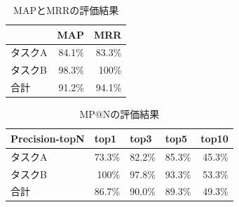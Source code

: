 \documentclass[12pt]{jarticle} %
\begin{document}
\begin{table}[h]
\caption{MAPとMRRの評価結果}
\label{map}
\begin{center}
\begin{tabular}{|p{3cm}|p{3cm}|p{3cm}|}
\hline \hline
\multicolumn{1}{|r|}{} & \multicolumn{1}{p{3cm}|}{MAP} & \multicolumn{1}{p{3cm}|}{MRR} \\ \hline
タスクA & \multicolumn{1}{r|}{84.1\%} & \multicolumn{1}{r|}{83.3\%} \\ \hline
タスクB & \multicolumn{1}{r|}{98.3\%} & \multicolumn{1}{r|}{100\%} \\ \hline
合計 & \multicolumn{1}{r|}{91.2\%} & \multicolumn{1}{r|}{94.1\%} \\ \hline
\end{tabular}
\end{center}
\end{table}

\begin{table}[h]
\caption{MP@Nの評価結果}
\label{pre}
\begin{center}
\begin{tabular}{|p{3cm}|p{2cm}|p{2cm}|p{2cm}|p{2cm}|}
\hline \hline
Precision-topN & top1 & top3 & top5 & top10 \\ \hline
タスクA & \multicolumn{1}{r|}{73.3\%} & \multicolumn{1}{r|}{82.2\%} & \multicolumn{1}{r|}{85.3\%} & \multicolumn{1}{r|}{45.3\%} \\ \hline
タスクB & \multicolumn{1}{r|}{100\%} & \multicolumn{1}{r|}{97.8\%} & \multicolumn{1}{r|}{93.3\%} & \multicolumn{1}{r|}{53.3\%} \\ \hline
合計 & \multicolumn{1}{r|}{86.7\%} & \multicolumn{1}{r|}{90.0\%} & \multicolumn{1}{r|}{89.3\%} & \multicolumn{1}{r|}{49.3\%} \\ \hline
\end{tabular}
\end{center}
\end{table}
\end{document}
